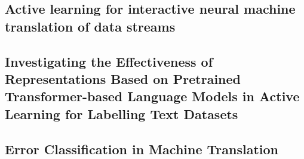 
\subsection{Active learning for interactive neural machine translation of data streams}
\label{active-learning-interactive}
  

\subsection{Investigating the Effectiveness of Representations Based on Pretrained 
Transformer-based Language Models in Active Learning for Labelling Text Datasets}
\label{investigating-effectiveness}


\subsection{Error Classification in Machine Translation}
\label{ssec:related_errors}




